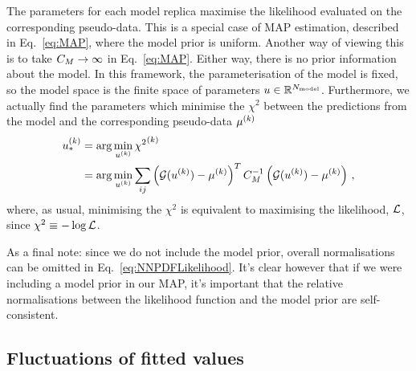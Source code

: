 The parameters for
each model replica maximise the likelihood evaluated on the corresponding
pseudo-data. This is a special case of MAP estimation,
described in Eq.~\eqref{eq:MAP}, where the model prior is uniform. Another way
of viewing this is to take $C_M \to \infty$ in Eq.~\eqref{eq:MAP}.
Either way, there is no prior information about the
model. In this framework, the parameterisation of the model is fixed, so the
model space is the finite space of parameters $u \in \mathbb{R}^{N_{\rm model}}$.
Furthermore, we actually find the
parameters which minimise the $\chi^2$ between the predictions from the model
and the corresponding pseudo-data $\mu^{(k)}$
\begin{equation}\label{eq:NNPDFLikelihood}
    \begin{split}
        u_*^{(k)} &= \arg\min_{u^{(k)}} {\chi^2}^{(k)} \\
        &= \arg\min_{u^{(k)}} \sum_{ij}
        \left( \mathcal{G}(u^{(k)}) - \mu^{(k)} \right)^T
        C_M^{-1}
        \left( \mathcal{G}(u^{(k)}) - \mu^{(k)} \right) \, ,
    \end{split}
\end{equation}
where, as usual,
minimising the $\chi^2$ is equivalent to maximising the likelihood,
$\mathcal{L}$, since $\chi^2 \equiv -\log{\mathcal{L}}$.

As a final note:
since we do not include the model prior, overall normalisations can be omitted
in Eq.~\ref{eq:NNPDFLikelihood}. It's clear however that if we were including
a model prior in our MAP, it's important that the relative normalisations between
the likelihood function and the model prior are self-consistent.

\subsection{Fluctuations of fitted values}
\label{sec:fluct-fit-values}

